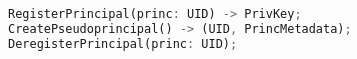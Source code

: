 \begin{figure}[t]
\begin{lstlisting}[language=Rust, style=rust]
RegisterPrincipal(princ: UID) -> PrivKey;
CreatePseudoprincipal() -> (UID, PrincMetadata);
DeregisterPrincipal(princ: UID);


\end{lstlisting}
\end{figure}
